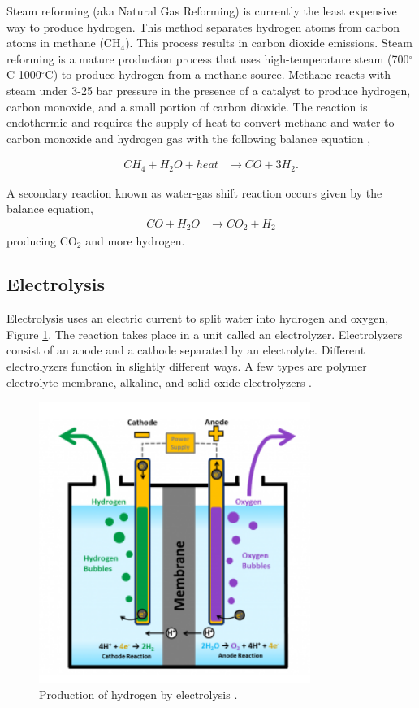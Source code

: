 \documentclass{anstrans}
\begin{document}
Steam reforming (aka Natural Gas Reforming) is currently the least expensive way to produce hydrogen. This method separates hydrogen atoms from carbon atoms in methane (CH$_4$). This process results in carbon dioxide emissions.
Steam reforming is a mature production process that uses high-temperature steam (700$^{\circ}$C-1000$^{\circ}$C) to produce hydrogen from a methane source. Methane reacts with steam under 3-25 bar pressure in the presence of a catalyst to produce hydrogen, carbon monoxide, and a small portion of carbon dioxide. The reaction is endothermic and requires the supply of heat to convert methane and water to carbon monoxide and hydrogen gas with the following balance equation \cite{doe_office_of_energy_efficiency_and_renewable_energy_hydrogen_2020},

\begin{align}
CH_4 + H_2O + heat & \rightarrow CO + 3H_2 .
\label{eq:1}
\end{align}

A secondary reaction known as water-gas shift reaction occurs given by the balance equation,
\begin{align}
CO + H_2O & \rightarrow CO_2 + H_2
\label{eq:2}
\end{align}
producing CO$_2$ and more hydrogen.

\subsection{Electrolysis}

Electrolysis uses an electric current to split water into hydrogen and oxygen, Figure \ref{fig:electro}. The reaction takes place in a unit called an electrolyzer. Electrolyzers consist of an anode and a cathode separated by an electrolyte. Different electrolyzers function in slightly different ways. A few types are polymer electrolyte membrane, alkaline, and solid oxide electrolyzers \cite{doe_office_of_energy_efficiency_and_renewable_energy_hydrogen_2020}.

\begin{figure}[H]
	\centering
	\includegraphics[width=0.55\linewidth]{figures/electrolysis.png}
	\hfill
	\caption{Production of hydrogen by electrolysis \cite{doe_office_of_energy_efficiency_and_renewable_energy_hydrogen_2020}.}
	\label{fig:electro}
\end{figure}
\end{document}
